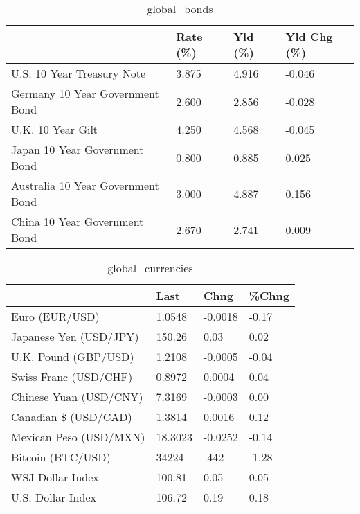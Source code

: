 \documentclass{article}%
\begin{document}
%


\begin{table}[htbp]%
\caption{global\_bonds}%
\centering%
\begin{adjustbox}{width=1\textwidth}%
\begin{tabular}{llll}
\toprule
                                  & Rate (\%) & Yld (\%) & Yld Chg (\%) \\
\midrule
       U.S. 10 Year Treasury Note &    3.875 &   4.916 &      -0.046 \\
  Germany 10 Year Government Bond &    2.600 &   2.856 &      -0.028 \\
                U.K. 10 Year Gilt &    4.250 &   4.568 &      -0.045 \\
    Japan 10 Year Government Bond &    0.800 &   0.885 &       0.025 \\
Australia 10 Year Government Bond &    3.000 &   4.887 &       0.156 \\
    China 10 Year Government Bond &    2.670 &   2.741 &       0.009 \\
\bottomrule
\end{tabular}
%
\end{adjustbox}%
\end{table}

%


\begin{table}[htbp]%
\caption{global\_currencies}%
\centering%
\begin{adjustbox}{width=1\textwidth}%
\begin{tabular}{llll}
\toprule
                       &    Last &    Chng & \%Chng \\
\midrule
        Euro (EUR/USD) &  1.0548 & -0.0018 & -0.17 \\
Japanese Yen (USD/JPY) &  150.26 &    0.03 &  0.02 \\
  U.K. Pound (GBP/USD) &  1.2108 & -0.0005 & -0.04 \\
 Swiss Franc (USD/CHF) &  0.8972 &  0.0004 &  0.04 \\
Chinese Yuan (USD/CNY) &  7.3169 & -0.0003 &  0.00 \\
  Canadian \$ (USD/CAD) &  1.3814 &  0.0016 &  0.12 \\
Mexican Peso (USD/MXN) & 18.3023 & -0.0252 & -0.14 \\
     Bitcoin (BTC/USD) &   34224 &    -442 & -1.28 \\
      WSJ Dollar Index &  100.81 &    0.05 &  0.05 \\
     U.S. Dollar Index &  106.72 &    0.19 &  0.18 \\
\bottomrule
\end{tabular}
%
\end{adjustbox}%
\end{table}
\end{document}
